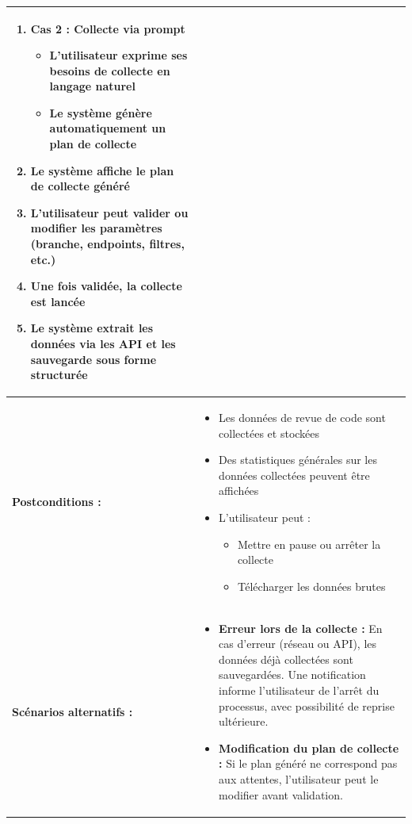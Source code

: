 \begin{tabularx}{\textwidth}{|l|X|}
\begin{enumerate}
    \item \textbf{Cas 2 : Collecte via prompt}
    \begin{itemize}
        \item L’utilisateur exprime ses besoins de collecte en langage naturel
        \item Le système génère automatiquement un plan de collecte
    \end{itemize}

    \item Le système affiche le plan de collecte généré
    \item L’utilisateur peut valider ou modifier les paramètres (branche, endpoints, filtres, etc.)
    \item Une fois validée, la collecte est lancée
    \item Le système extrait les données via les API et les sauvegarde sous forme structurée
\end{enumerate} \\ \hline

\textbf{Postconditions :} & 
\begin{itemize}
    \item Les données de revue de code sont collectées et stockées
    \item Des statistiques générales sur les données collectées peuvent être affichées
    \item L’utilisateur peut :
    \begin{itemize}
        \item Mettre en pause ou arrêter la collecte
        \item Télécharger les données brutes
    \end{itemize}
\end{itemize} \\ \hline

\textbf{Scénarios alternatifs :} & 
\begin{itemize}
    \item \textbf{Erreur lors de la collecte :}
    En cas d’erreur (réseau ou API), les données déjà collectées sont sauvegardées. Une notification informe l’utilisateur de l’arrêt du processus, avec possibilité de reprise ultérieure.

    \item \textbf{Modification du plan de collecte :}
    Si le plan généré ne correspond pas aux attentes, l’utilisateur peut le modifier avant validation.
\end{itemize} \\ \hline

\end{tabularx}



